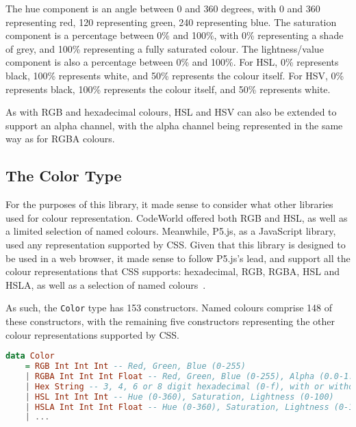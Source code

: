 \documentclass[../main.tex]{subfiles}
\begin{document}
                The hue component is an angle between 0 and 360 degrees, with 0 and 360
                    representing red, 120 representing green, 240 representing blue.
                The saturation component is a percentage between 0\% and 100\%, with 0\%
                    representing a shade of grey, and 100\% representing a fully saturated colour.
                The lightness/value component is also a percentage between 0\% and 100\%.
                For HSL, 0\% represents black, 100\% represents white, and 50\% represents the
                    colour itself.
                For HSV, 0\% represents black, 100\% represents the colour itself, and 50\%
                    represents white.

                As with RGB and hexadecimal colours, HSL and HSV can also be extended to
                    support an alpha channel, with the alpha channel being represented in the same
                    way as for RGBA colours.

        \subsection{The Color Type}
            For the purposes of this library, it made sense to consider what other
                libraries used for colour representation.
            CodeWorld offered both RGB and HSL, as well as a limited selection of named
                colours.
            Meanwhile, P5.js, as a JavaScript library, used any representation supported by
                CSS.
            Given that this library is designed to be used in a web browser, it made sense
                to follow P5.js's lead, and support all the colour representations that CSS
                supports: hexadecimal, RGB, RGBA, HSL and HSLA, as well as a selection of named
                colours~\citep{cssColours}.

            As such, the \verb|Color| type has 153 constructors.
            Named colours comprise 148 of these constructors, with the remaining five
                constructors representing the other colour representations supported by CSS.

            \begin{lstlisting}[language=haskell, label={lst:color}, caption={The Color type definition.
                Named colours have been omitted for brevity, but are included in the actual
                implementation, as seen in Appendix~\ref{app:code}.}]
data Color
    = RGB Int Int Int -- Red, Green, Blue (0-255)
    | RGBA Int Int Int Float -- Red, Green, Blue (0-255), Alpha (0.0-1.0)
    | Hex String -- 3, 4, 6 or 8 digit hexadecimal (0-f), with or without #, upper or lower case
    | HSL Int Int Int -- Hue (0-360), Saturation, Lightness (0-100)
    | HSLA Int Int Int Float -- Hue (0-360), Saturation, Lightness (0-100), Alpha (0.0-1.0)
    | ...
            \end{lstlisting}
\end{document}
